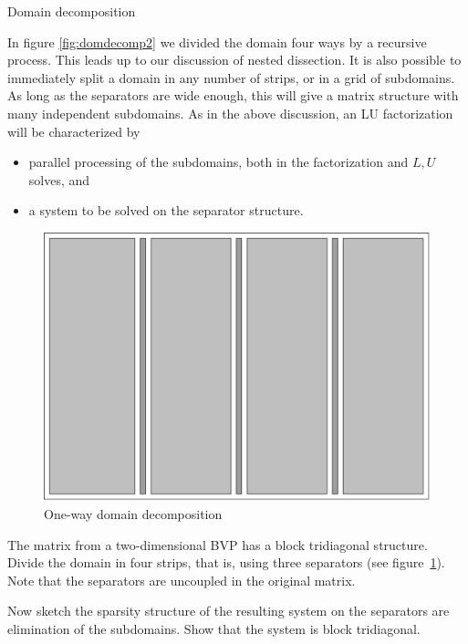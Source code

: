  {Domain decomposition}

In figure \ref{fig:domdecomp2} we divided the domain four ways by a
recursive process. This leads up to our discussion of nested
dissection. It is also possible to immediately split a domain in any
number of strips, or in a grid of subdomains. As long as the
separators are wide enough, this will give a matrix structure with
many independent subdomains.
As in the above discussion, an LU factorization will be characterized
by
\begin{itemize}
\item parallel processing of the subdomains, both in the factorization
  and $L,U$ solves, and
\item a system to be solved on the separator structure.
\end{itemize}

\begin{figure}[ht]
  \includegraphics[scale=.16]{graphics/domdecomp4}
  \caption{One-way domain decomposition}
  \label{fig:domdecomp4}
\end{figure}

\begin{exercise}
  The matrix from a two-dimensional \ac{BVP} has a block tridiagonal
  structure. Divide the domain in four strips, that is, using three
  separators (see figure~\ref{fig:domdecomp4}). Note that the
  separators are uncoupled in the original matrix.

  Now sketch the sparsity structure of the resulting system on the
  separators are elimination of the subdomains. Show that the system
  is block tridiagonal.
\end{exercise}

